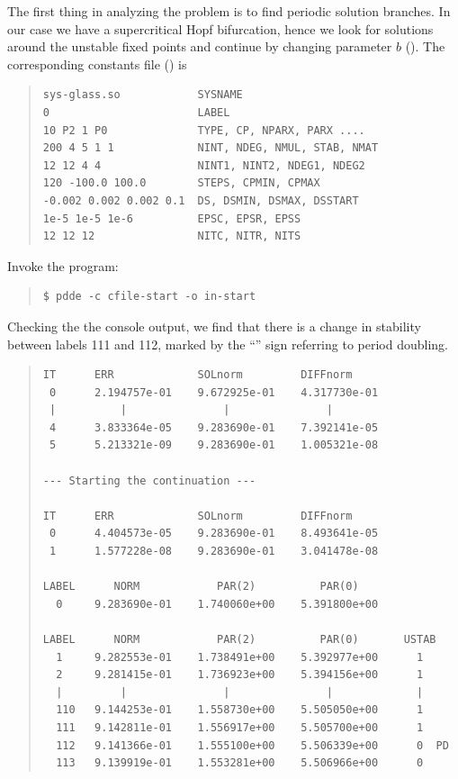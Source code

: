 \documentclass[10pt,a4paper]{ddedoc}
\begin{document}
The first thing in analyzing the problem is to find periodic solution
branches. In our case we have a supercritical Hopf bifurcation, hence we look
for solutions around the unstable fixed points and continue by changing
parameter $b$ (). The corresponding constants file () is
{ \small \begin{quote} \begin{lstlisting}[basicstyle=\tt,frame=single]
sys-glass.so            SYSNAME
0                       LABEL
10 P2 1 P0              TYPE, CP, NPARX, PARX ....
200 4 5 1 1             NINT, NDEG, NMUL, STAB, NMAT
12 12 4 4               NINT1, NINT2, NDEG1, NDEG2
120 -100.0 100.0        STEPS, CPMIN, CPMAX
-0.002 0.002 0.002 0.1  DS, DSMIN, DSMAX, DSSTART
1e-5 1e-5 1e-6          EPSC, EPSR, EPSS
12 12 12                NITC, NITR, NITS
\end{lstlisting} \end{quote} } \noindent
Invoke the program:
{ \small \begin{quote} \begin{lstlisting}[basicstyle=\tt,frame=single]
$ pdde -c cfile-start -o in-start
\end{lstlisting} \end{quote} } \noindent
Checking the the console output, we find that there is a change in
stability between labels 111 and 112, marked by the ``'' sign referring to period doubling.
{ \small \begin{quote} \begin{lstlisting}[basicstyle=\tt,frame=single]
IT      ERR             SOLnorm         DIFFnorm
 0      2.194757e-01    9.672925e-01    4.317730e-01
 |          |               |               |
 4      3.833364e-05    9.283690e-01    7.392141e-05
 5      5.213321e-09    9.283690e-01    1.005321e-08

--- Starting the continuation ---

IT      ERR             SOLnorm         DIFFnorm
 0      4.404573e-05    9.283690e-01    8.493641e-05
 1      1.577228e-08    9.283690e-01    3.041478e-08

LABEL      NORM            PAR(2)          PAR(0)
  0     9.283690e-01    1.740060e+00    5.391800e+00

LABEL      NORM            PAR(2)          PAR(0)       USTAB
  1     9.282553e-01    1.738491e+00    5.392977e+00      1
  2     9.281415e-01    1.736923e+00    5.394156e+00      1
  |         |               |               |             |
  110   9.144253e-01    1.558730e+00    5.505050e+00      1
  111   9.142811e-01    1.556917e+00    5.505700e+00      1
  112   9.141366e-01    1.555100e+00    5.506339e+00      0  PD
  113   9.139919e-01    1.553281e+00    5.506966e+00      0
\end{lstlisting} \end{quote} } \noindent
\end{document}
